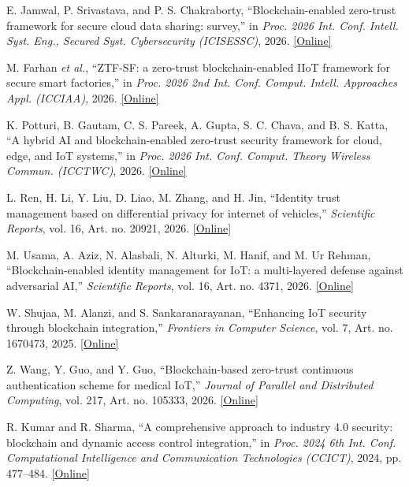 E. Jamwal, P. Srivastava, and P. S. Chakraborty, ``Blockchain-enabled zero-trust framework for secure cloud data sharing: survey,'' in \emph{Proc. 2026 Int. Conf. Intell. Syst. Eng., Secured Syst. Cybersecurity (ICISESSC)}, 2026. \href{https://doi.org/10.1109/ICISESSC68634.2026.11542695}{[Online]}

M. Farhan \emph{et al.}, ``ZTF-SF: a zero-trust blockchain-enabled IIoT framework for secure smart factories,'' in \emph{Proc. 2026 2nd Int. Conf. Comput. Intell. Approaches Appl. (ICCIAA)}, 2026. \href{https://doi.org/10.1109/ICCIAA68481.2026.11543806}{[Online]}

K. Potturi, B. Gautam, C. S. Pareek, A. Gupta, S. C. Chava, and B. S. Katta, ``A hybrid AI and blockchain-enabled zero-trust security framework for cloud, edge, and IoT systems,'' in \emph{Proc. 2026 Int. Conf. Comput. Theory Wireless Commun. (ICCTWC)}, 2026. \href{https://doi.org/10.1109/ICCTWC68241.2026.11582964}{[Online]}

L. Ren, H. Li, Y. Liu, D. Liao, M. Zhang, and H. Jin, ``Identity trust management based on differential privacy for internet of vehicles,'' \emph{Scientific Reports}, vol. 16, Art. no. 20921, 2026. \href{https://doi.org/10.1038/s41598-026-50273-z}{[Online]}

M. Usama, A. Aziz, N. Alasbali, N. Alturki, M. Hanif, and M. Ur Rehman, ``Blockchain-enabled identity management for IoT: a multi-layered defense against adversarial AI,'' \emph{Scientific Reports}, vol. 16, Art. no. 4371, 2026. \href{https://doi.org/10.1038/s41598-026-35208-y}{[Online]}

W. Shujaa, M. Alanzi, and S. Sankaranarayanan, ``Enhancing IoT security through blockchain integration,'' \emph{Frontiers in Computer Science}, vol. 7, Art. no. 1670473, 2025. \href{https://doi.org/10.3389/fcomp.2025.1670473}{[Online]}

Z. Wang, Y. Guo, and Y. Guo, ``Blockchain-based zero-trust continuous authentication scheme for medical IoT,'' \emph{Journal of Parallel and Distributed Computing}, vol. 217, Art. no. 105333, 2026. \href{https://doi.org/10.1016/j.jpdc.2026.105333}{[Online]}

R. Kumar and R. Sharma, ``A comprehensive approach to industry 4.0 security: blockchain and dynamic access control integration,'' in \emph{Proc. 2024 6th Int. Conf. Computational Intelligence and Communication Technologies (CCICT)}, 2024, pp. 477--484. \href{https://doi.org/10.1109/CCICT62777.2024.00080}{[Online]}

